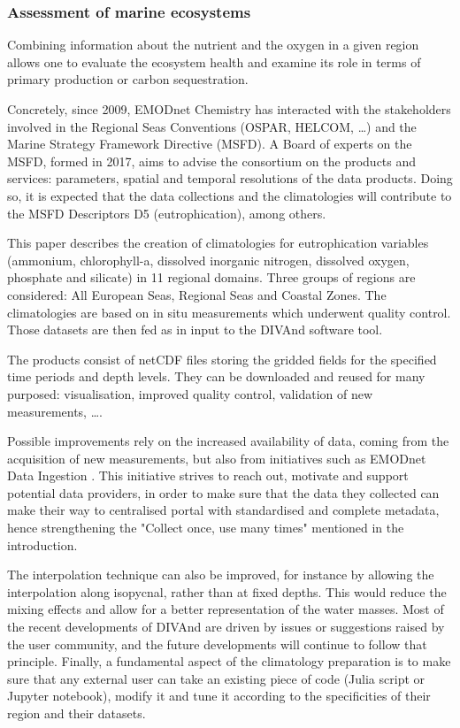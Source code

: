 \documentclass[essd, manuscript]{copernicus}
\begin{document}
\subsubsection{Assessment of marine ecosystems}

Combining information about the nutrient and the oxygen in a given region allows one to evaluate the ecosystem health and examine its role in terms of primary production or carbon sequestration.

Concretely, since 2009, EMODnet Chemistry has interacted with the stakeholders involved in the Regional Seas Conventions (OSPAR, HELCOM, \ldots) and the Marine Strategy Framework Directive (MSFD). A Board of experts on the MSFD, formed in 2017, aims to advise the consortium on the products and services: parameters, spatial and temporal resolutions of the data products. Doing so, it is expected that the data collections and the climatologies will contribute to the MSFD Descriptors D5 (eutrophication), among others.

\conclusions  
This paper describes the creation of climatologies for eutrophication variables (ammonium, chlorophyll-a, dissolved inorganic nitrogen, dissolved oxygen, phosphate and silicate) in 11 regional domains. Three groups of regions are considered: All European Seas, Regional Seas and Coastal Zones. The climatologies are based on in situ measurements which underwent quality control. Those datasets are then fed as in input to the DIVAnd software tool. 

The products consist of netCDF files storing the gridded fields for the specified time periods and depth levels. They can be downloaded and reused for many purposed: visualisation, improved quality control, validation of new measurements, \ldots. 

Possible improvements rely on the increased availability of data, coming from the acquisition of new measurements, but also from initiatives such as EMODnet Data Ingestion \citep{IONA2024}. This initiative strives to reach out, motivate and support potential data providers, in order to make sure that the data they collected can make their way to centralised portal with standardised and complete metadata, hence strengthening the "Collect once, use many times" mentioned in the introduction. 

The interpolation technique can also be improved, for instance by allowing the interpolation along isopycnal, rather than at fixed depths. This would reduce the mixing effects and allow for a better representation of the water masses. Most of the recent developments of DIVAnd are driven by issues or suggestions raised by the user community, and the future developments will continue to follow that principle. Finally, a fundamental aspect of the climatology preparation is to make sure that any external user can take an existing piece of code (Julia script or Jupyter notebook), modify it and tune it according to the specificities of their region and their datasets. 
\end{document}
